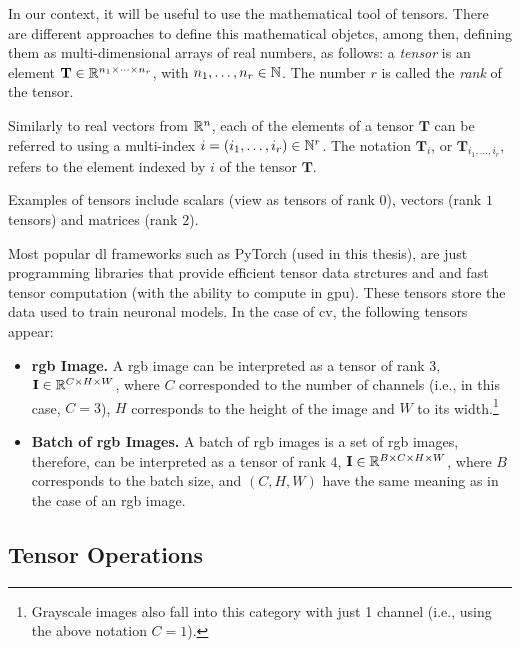 In our context, it will be useful to use the mathematical tool of
tensors. There are different approaches to define this mathematical objetcs,
among then, defining them as multi-dimensional arrays of real numbers, as
follows: a \emph{tensor} is an element
\(\mathbf{T} \in \mathbb{R}^{n_1 \times \cdots \times n_r}\), with
\(n_1, \ldots, n_r \in \mathbb{N}\). The number \(r\) is called the \emph{rank} of the
tensor.

Similarly to real vectors from \(\mathbb{R}^n\), each of the elements of a tensor
\(\mathbf{T}\) can be referred to using a multi-index
\(i = (i_1, \ldots, i_r) \in \mathbb{N}^r\). The notation \(\mathbf{T}_i\), or
\(\mathbf{T}_{i_1, \ldots, i_r}\), refers to the element indexed by \(i\) of
the tensor \(\mathbf{T}\).

\begin{exampleBox}
  Examples of tensors include scalars (view as tensors of rank \(0\)), vectors
  (rank \(1\) tensors) and matrices (rank \(2\)).
\end{exampleBox}

Most popular \gls{dl} frameworks such as PyTorch (used in this thesis), are
just programming libraries that provide efficient tensor data strctures and and
fast tensor computation (with the ability to compute in \gls{gpu}). These
tensors store the data used to train neuronal models. In the case of \gls{cv},
the following tensors appear:
\begin{itemize}
  \item \textbf{\acs{rgb} Image.} A \acs{rgb} image can be interpreted as a
  tensor of rank 3, \(\mathbf{I} \in \mathbb{R}^{C \times H \times W}\), where \(C\)
  corresponded to the number of channels (i.e., in this case, \(C = 3\)), \(H\)
  corresponds to the height of the image and \(W\) to its
  width.\footnote{Grayscale images also fall into this category with just 1
    channel (i.e., using the above notation \(C = 1\)).}
  \item \textbf{Batch of \acs{rgb} Images.} A batch of \acs{rgb} images is a
  set of \acs{rgb} images, therefore, can be interpreted as a tensor of rank 4,
  \(\mathbf{I} \in \mathbb{R}^{B \times C \times H \times W}\), where \(B\) corresponds
  to the batch size, and \((C, H, W)\) have the same meaning as in the case of
  an \acs{rgb} image.
\end{itemize}


\subsection{Tensor Operations}

